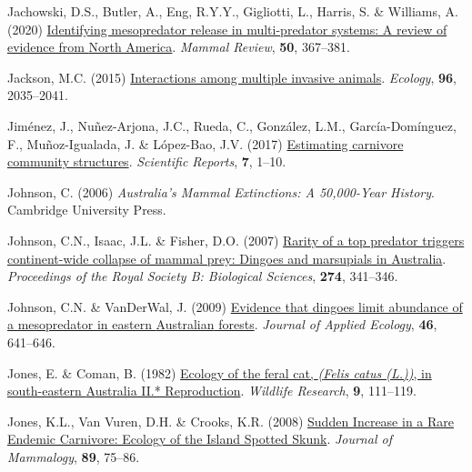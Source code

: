 \documentclass[11pt,a4paper,titlepage,twoside,openright]{style/unimelbthesis}
\newenvironment{CSLReferences}%
  {}%
  {\par}
\begin{document}
\begin{mainmatter}
\begin{CSLReferences}{1}{0}
\leavevmode{}%
Jachowski, D.S., Butler, A., Eng, R.Y.Y., Gigliotti, L., Harris, S. \& Williams, A. (2020) \href{https://doi.org/10.1111/mam.12207}{Identifying mesopredator release in multi-predator systems: A review of evidence from {North America}}. \emph{Mammal Review}, \textbf{50}, 367--381.

\leavevmode{}%
Jackson, M.C. (2015) \href{https://doi.org/10.1890/15-0171.1}{Interactions among multiple invasive animals}. \emph{Ecology}, \textbf{96}, 2035--2041.

\leavevmode{}%
Jiménez, J., Nuñez-Arjona, J.C., Rueda, C., González, L.M., García-Domínguez, F., Muñoz-Igualada, J. \& López-Bao, J.V. (2017) \href{https://doi.org/10.1038/srep41036}{Estimating carnivore community structures}. \emph{Scientific Reports}, \textbf{7}, 1--10.

\leavevmode{}%
Johnson, C. (2006) \emph{{A}ustralia's Mammal Extinctions: A 50,000-Year History}. Cambridge University Press.

\leavevmode{}%
Johnson, C.N., Isaac, J.L. \& Fisher, D.O. (2007) \href{https://doi.org/10.1098/rspb.2006.3711}{Rarity of a top predator triggers continent-wide collapse of mammal prey: Dingoes and marsupials in {{A}ustralia}}. \emph{Proceedings of the Royal Society B: Biological Sciences}, \textbf{274}, 341--346.

\leavevmode{}%
Johnson, C.N. \& VanDerWal, J. (2009) \href{https://doi.org/10.1111/j.1365-2664.2009.01650.x}{Evidence that dingoes limit abundance of a mesopredator in eastern {{A}ustralian} forests}. \emph{Journal of Applied Ecology}, \textbf{46}, 641--646.

\leavevmode{}%
Jones, E. \& Coman, B. (1982) \href{https://doi.org/10.1071/WR9820111}{Ecology of the feral cat, \emph{({Felis catus (L.)})}, in south-eastern {{A}ustralia II.* Reproduction}}. \emph{Wildlife Research}, \textbf{9}, 111--119.

\leavevmode{}%
Jones, K.L., Van Vuren, D.H. \& Crooks, K.R. (2008) \href{https://doi.org/10.1644/07-MAMM-A-034.1}{{Sudden Increase in a Rare Endemic Carnivore: Ecology of the Island Spotted Skunk}}. \emph{Journal of Mammalogy}, \textbf{89}, 75--86.


\end{CSLReferences}
\end{mainmatter}
\end{document}
